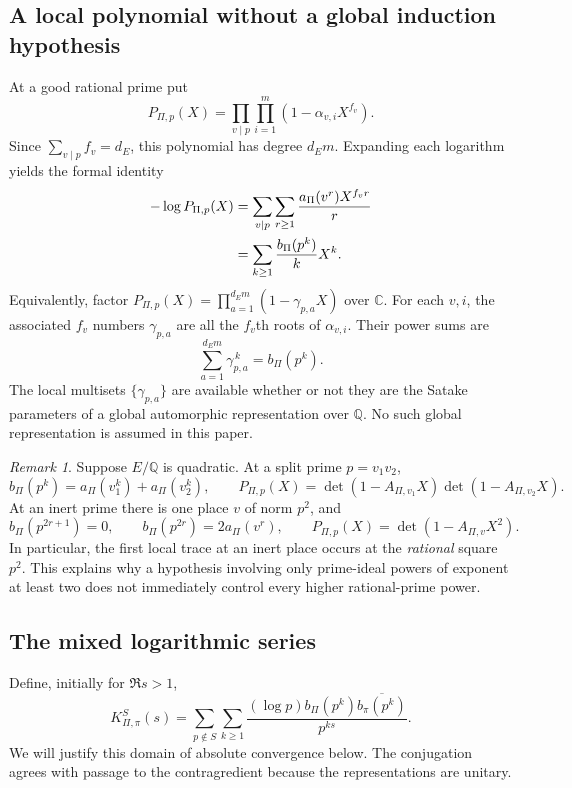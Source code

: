 \documentclass[11pt,reqno]{amsart}
\numberwithin{equation}{section}
\theoremstyle{definition}
\theoremstyle{remark}
\newtheorem{remark}[theorem]{Remark}
\newcommand{\Q}{\mathbb Q}
\begin{document}
\subsection{A local polynomial without a global induction hypothesis}
At a good rational prime put
\begin{equation}\label{id:formal-polynomial}
 P_{\Pi,p}(X)=\prod_{v\mid p}\prod_{i=1}^{m}
                  (1-\alpha_{v,i}X^{f_v}).
\end{equation}
Since $\sum_{v\mid p}f_v=d_E$, this polynomial has degree $d_Em$.
Expanding each logarithm yields the formal identity
\begin{align}
 -\log P_{\Pi,p}(X)
 &=\sum_{v\mid p}\sum_{r\ge1}
               \frac{a_\Pi(v^r)X^{f_vr}}{r}\notag\\
 &=\sum_{k\ge1}\frac{b_\Pi(p^k)}{k}X^k.
 \label{id:polynomial-traces}
\end{align}
Equivalently, factor $P_{\Pi,p}(X)=\prod_{a=1}^{d_Em}(1-\gamma_{p,a}X)$
over $\mathbb C$. For each $v,i$, the associated $f_v$ numbers $\gamma_{p,a}$
are all the $f_v$th roots of $\alpha_{v,i}$. Their power sums are
\begin{equation}\label{id:formal-power-sums}
 \sum_{a=1}^{d_Em}\gamma_{p,a}^{\,k}=b_\Pi(p^k).
\end{equation}
The local multisets $\{\gamma_{p,a}\}$ are available whether or not they are
the Satake parameters of a global automorphic representation over $\Q$.
No such global representation is assumed in this paper.

\begin{remark}\label{id:quadratic-example}
Suppose $E/\Q$ is quadratic. At a split prime $p=v_1v_2$,
\[
 b_\Pi(p^k)=a_\Pi(v_1^k)+a_\Pi(v_2^k),\qquad
 P_{\Pi,p}(X)=\det(1-A_{\Pi,v_1}X)\det(1-A_{\Pi,v_2}X).
\]
At an inert prime there is one place $v$ of norm $p^2$, and
\[
 b_\Pi(p^{2r+1})=0,\qquad b_\Pi(p^{2r})=2a_\Pi(v^r),\qquad
 P_{\Pi,p}(X)=\det(1-A_{\Pi,v}X^2).
\]
In particular, the first local trace at an inert place occurs at the
\emph{rational} square $p^2$. This explains why a hypothesis involving only
prime-ideal powers of exponent at least two does not immediately control
every higher rational-prime power.
\end{remark}

\subsection{The mixed logarithmic series}
Define, initially for $\Re s>1$,
\begin{equation}\label{id:mixed-K}
 K_{\Pi,\pi}^S(s)=
 \sum_{p\notin S}\sum_{k\ge1}
 \frac{(\log p)b_\Pi(p^k)\overline{b_\pi(p^k)}}{p^{ks}}.
\end{equation}
We will justify this domain of absolute convergence below. The conjugation
agrees with passage to the contragredient because the representations are
unitary.
\end{document}
